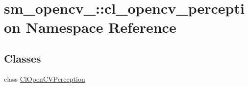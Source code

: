 \hypertarget{namespacesm__opencv__3_1_1cl__opencv__perception}{}\section{sm\+\_\+opencv\+\_\+:\+:cl\+\_\+opencv\+\_\+perception Namespace Reference}
\label{namespacesm__opencv__3_1_1cl__opencv__perception}
\subsection*{Classes}
\begin{DoxyCompactItemize}
\item 
class \hyperlink{classsm__opencv__3_1_1cl__opencv__perception_1_1ClOpenCVPerception}{Cl\+Open\+C\+V\+Perception}
\end{DoxyCompactItemize}
